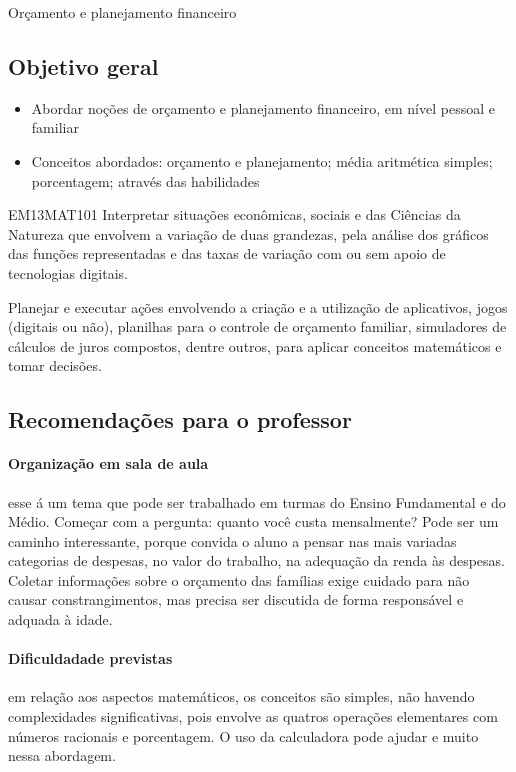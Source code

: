 \begin{paginatexto}{Orçamento e planejamento financeiro}

\subsection*{Objetivo geral}

\begin{itemize}
\item Abordar noções de orçamento e planejamento financeiro, em nível pessoal e familiar

\item Conceitos abordados: orçamento e planejamento; média aritmética simples; porcentagem; através das habilidades
\end{itemize}

\begin{habilities}{EM13MAT101}
 Interpretar situações econômicas, sociais e das Ciências da Natureza
que envolvem a variação de duas grandezas, pela análise dos gráficos das funções representadas e das taxas de variação com ou sem apoio de tecnologias digitais.

Planejar e executar ações envolvendo a criação e a utilização de aplicativos, jogos (digitais ou não), planilhas para o controle de orçamento familiar, simuladores de cálculos de juros compostos, dentre outros, para aplicar conceitos matemáticos e tomar decisões. 

\end{habilities}

\subsection*{Recomendações para o professor}

\paragraph{Organização em sala de aula} esse á um tema que pode ser trabalhado em turmas do Ensino Fundamental e do Médio. Começar com a pergunta: quanto você custa mensalmente? Pode ser um caminho interessante, porque convida o aluno a pensar nas mais variadas categorias de despesas, no valor do trabalho, na adequação da renda às despesas. Coletar informações sobre o orçamento das famílias exige cuidado para não causar constrangimentos, mas precisa ser discutida de forma responsável e adquada à idade.

\paragraph{Dificuldadade previstas} em relação aos aspectos matemáticos, os conceitos são simples, não havendo complexidades significativas, pois envolve as quatros operações elementares com números racionais e porcentagem. O uso da calculadora pode ajudar e muito nessa abordagem.


\end{paginatexto}
